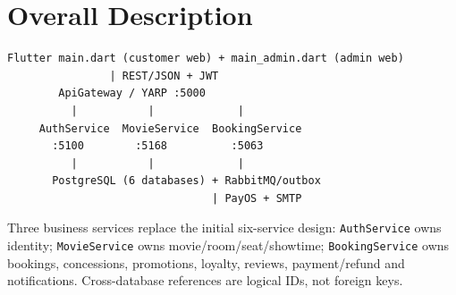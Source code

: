 \clearpage
\section{Overall Description}\label{sec:srs-4}
\begin{Verbatim}
Flutter main.dart (customer web) + main_admin.dart (admin web)
                | REST/JSON + JWT
        ApiGateway / YARP :5000
          |           |             |
     AuthService  MovieService  BookingService
       :5100        :5168          :5063
          |           |             |
       PostgreSQL (6 databases) + RabbitMQ/outbox
                                | PayOS + SMTP
\end{Verbatim}
Three business services replace the initial six-service design: \texttt{Auth\allowbreak{}Service} owns identity; \texttt{Movie\allowbreak{}Service} owns movie/\allowbreak{}room/\allowbreak{}seat/\allowbreak{}showtime; \texttt{Booking\allowbreak{}Service} owns bookings, concessions, promotions, loyalty, reviews, payment/\allowbreak{}refund and notifications. Cross-database references are logical IDs, not foreign keys.
